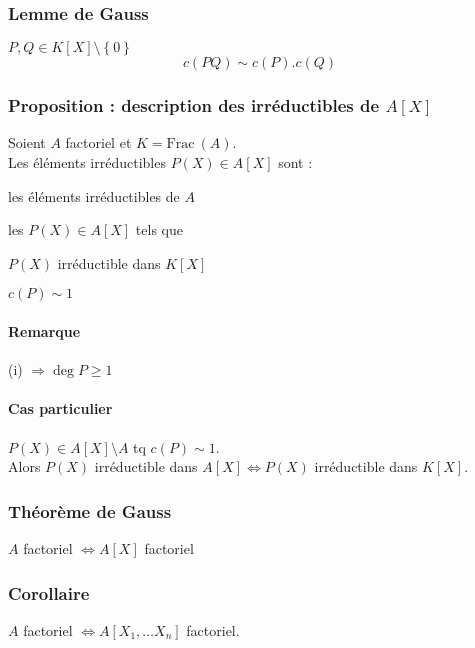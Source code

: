 \documentclass[reqno,a4paper,10pt]{report}
\makeatletter
\newcommand{\set}[1]{\left\lbrace #1 \right\rbrace} %
\newcommand{\Frac}{\mathrm{Frac}\:} %
\newcommand{\so}{\Rightarrow}
\let\oldenumerate=\enumerate%
\renewenvironment{enumerate}{%
    \oldenumerate%
  }{%
    \@noparlisttrue%
    \endlist%
  }%
\makeatother
\begin{document}
\subsubsection{Lemme de Gauss}
$P,Q \in K[X]\setminus\set{0}$
\[c(PQ)\sim c(P).c(Q)\]
\begin{comment}
  Preuve 03/12/09 p2 verso
\end{comment}

\subsubsection{Proposition : description des irréductibles de $A[X]$}
Soient $A$ factoriel et $K=\Frac(A)$.\\
Les éléments irréductibles $P(X) \in A[X]$ sont :
\begin{enumerate}
  \item les éléments irréductibles de $A$
  \item les $P(X)\in A[X]$ tels que
    \begin{enumerate}
      \item $P(X)$ irréductible dans $K[X]$
      \item $c(P)\sim 1$
    \end{enumerate}
\end{enumerate}
\begin{comment}
  Preuve 03/12/09 p3
\end{comment}

\paragraph{Remarque} (i) $\so \deg P \geq 1$
\paragraph{Cas particulier} $P(X) \in A[X]\setminus A$ tq $c(P) \sim 1$.\\
Alors $P(X)$ irréductible dans $A[X] \iff P(X)$ irréductible dans $K[X]$.

\subsubsection{Théorème de Gauss}
$A$ factoriel $\iff A[X]$ factoriel

\begin{comment}
  Preuve 03/12/09 p3 verso
\end{comment}

\subsubsection{Corollaire}
$A$ factoriel $\iff A[X_1,\dots X_n]$ factoriel.
\end{document}
